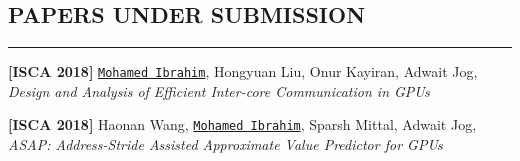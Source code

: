 \documentclass[10pt,a4]{article}
\begin{document}
\subsection*{PAPERS UNDER SUBMISSION}
\hrule
\vspace{0.2cm}

\begin{description}
\item 
{\bf [ISCA 2018]}
{\tt \underline{Mohamed Ibrahim}}, Hongyuan Liu, Onur Kayiran, Adwait Jog, 
{\it Design and Analysis of Efficient Inter-core Communication in GPUs}

\item 
{\bf [ISCA 2018]}
Haonan Wang, {\tt \underline{Mohamed Ibrahim}}, Sparsh Mittal, Adwait Jog, 
{\it ASAP: Address-Stride Assisted Approximate Value Predictor for GPUs}

\end{description}






\end{document}

